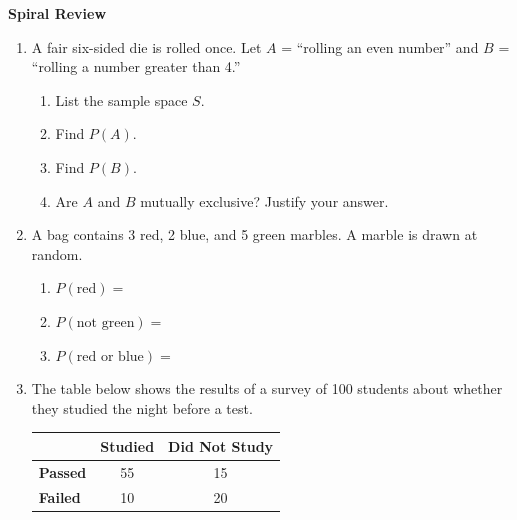 \documentclass[10pt]{article}
\begin{document}
\namedateperiod

\vspace{0.2in}

{\large\bfseries\color{navy} Spiral Review}

\vspace{0.12in}

\begin{enumerate}

    \item A fair six-sided die is rolled once. Let $A$ = ``rolling an even number'' and
          $B$ = ``rolling a number greater than 4.''

    \begin{enumerate}[label=(\alph*), itemsep=8pt]
        \item List the sample space $S$. \quad \blank{7cm}
        \item Find $P(A)$. \quad \blank{4cm}
        \item Find $P(B)$. \quad \blank{4cm}
        \item Are $A$ and $B$ mutually exclusive? Justify your answer.\\
              \writeline
    \end{enumerate}

    \vspace{0.14in}

    \item A bag contains 3 red, 2 blue, and 5 green marbles. A marble is drawn at random.
    \begin{enumerate}[label=(\alph*), itemsep=8pt]
        \item $P(\text{red}) = $ \blank{2.5cm}
        \item $P(\text{not green}) = $ \blank{2.5cm}
        \item $P(\text{red or blue}) = $ \blank{2.5cm}
    \end{enumerate}

    \vspace{0.14in}

    \item The table below shows the results of a survey of 100 students about whether
          they studied the night before a test.

    \vspace{6pt}
    \renewcommand{\arraystretch}{1.5}
    \begin{tabular}{@{}lcc@{}}
    & \textbf{Studied} & \textbf{Did Not Study} \\
    \hline
    \textbf{Passed} & 55 & 15 \\
    \textbf{Failed}  & 10 & 20 \\
    \end{tabular}


\end{enumerate}
\end{document}
